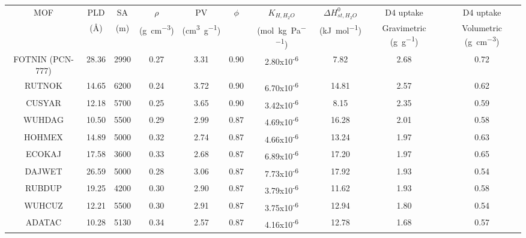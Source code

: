 \begin{widetable}[htb]
    \centering
    \caption{%
        Top 10 promising hydrophobic materials identified for D4 uptake obtained at \SI{298}{\kelvin}.
    }\label{tbl:top10}
    \begin{tabular}{@{}cccccccccc@{}}
    \toprule
    MOF & PLD & SA & \(\rho\) & PV & \(\phi\) & \(K_{H,H_{2}O}\) & \(\Delta H_{st,H_{2}O}^{0}\) &
    D4 uptake & D4 uptake \\

    & (Å) & (\si{\metre}) & (\si{\gram\per\centi\metre\cubed}) & (\si{\centi\metre\cubed\per\gram}) & 
    & (\si{\mol\per\kilo\gram\per\pascal}) & (\si{\kilo\joule\per\mol}) & Gravimetric (\si{\gram\per\gram}) & Volumetric (\si{\gram\per\centi\metre\cubed}) \\
    \midrule
    FOTNIN (PCN-777) & 28.36 & 2990 & 0.27 & 3.31 & 0.90 & 2.80x10\textsuperscript{-6} & 7.82 & 2.68 & 0.72\\
    RUTNOK & 14.65 & 6200 & 0.24 & 3.72 & 0.90 & 6.70x10\textsuperscript{-6} & 14.81 & 2.57 & 0.62\\
    CUSYAR & 12.18 & 5700 & 0.25 & 3.65 & 0.90 & 3.42x10\textsuperscript{-6} & 8.15 & 2.35 & 0.59\\
    WUHDAG & 10.50 & 5500 & 0.29 & 2.99 & 0.87 & 4.69x10\textsuperscript{-6} & 16.28 & 2.01 & 0.58\\
    HOHMEX & 14.89 & 5000 & 0.32 & 2.74 & 0.87 & 4.66x10\textsuperscript{-6} & 13.24 & 1.97 & 0.63\\
    ECOKAJ & 17.58 & 3600 & 0.33 & 2.68 & 0.87 & 6.89x10\textsuperscript{-6} & 17.20 & 1.97 & 0.65\\
    DAJWET & 26.59 & 5000 & 0.28 & 3.06 & 0.87 & 7.73x10\textsuperscript{-6} & 17.92 & 1.93 & 0.54\\
    RUBDUP & 19.25 & 4200 & 0.30 & 2.90 & 0.87 & 3.79x10\textsuperscript{-6} & 11.62 & 1.93 & 0.58\\
    WUHCUZ & 12.21 & 5500 & 0.30 & 2.91 & 0.87 & 3.75x10\textsuperscript{-6} & 12.94 & 1.80 & 0.54\\
    ADATAC & 10.28 & 5130 & 0.34 & 2.57 & 0.87 & 4.16x10\textsuperscript{-6} & 12.78 & 1.68 & 0.57\\
    \bottomrule
\end{tabular}
\end{widetable}


